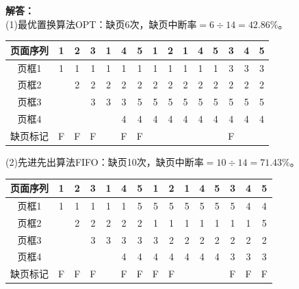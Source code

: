\documentclass[10pt,a4paper,UTF8]{ctexart}
\newenvironment{solution}{\noindent\textbf{解答：}\\ \indent}{\par}
\begin{document}
\begin{solution}
	(1)最优置换算法OPT：缺页6次，缺页中断率$=6\div 14=42.86\%$。
	\begin{table}[H]
		\vspace{-0.5em}
		\centering
		\begin{tabular}{|c|c|c|c|c|c|c|c|c|c|c|c|c|c|c|}
		\hline
		页面序列 & 1 & 2 & 3 & 1 & 4 & 5 & 1 & 2 & 1 & 4 & 5 & 3 & 4 & 5 \\ \hline
		页框1  & 1 & 1 & 1 & 1 & 1 & 1 & 1 & 1 & 1 & 1 & 1 & 3 & 3 & 3 \\ \hline
		页框2  &   & 2 & 2 & 2 & 2 & 2 & 2 & 2 & 2 & 2 & 2 & 2 & 2 & 2 \\ \hline
		页框3  &   &   & 3 & 3 & 3 & 5 & 5 & 5 & 5 & 5 & 5 & 5 & 5 & 5 \\ \hline
		页框4  &   &   &   &   & 4 & 4 & 4 & 4 & 4 & 4 & 4 & 4 & 4 & 4 \\ \hline
		缺页标记 & F & F & F &   & F & F &   &   &   &   &   & F &   &   \\ \hline
		\end{tabular}
		\vspace{-1em}
	\end{table}

	(2)先进先出算法FIFO：缺页10次，缺页中断率$=10\div 14=71.43\%$。
	\begin{table}[H]
		\vspace{-0.5em}
		\centering
		\begin{tabular}{|c|c|c|c|c|c|c|c|c|c|c|c|c|c|c|}
		\hline
		页面序列 & 1 & 2 & 3 & 1 & 4 & 5 & 1 & 2 & 1 & 4 & 5 & 3 & 4 & 5 \\ \hline
		页框1  & 1 & 1 & 1 & 1 & 1 & 5 & 5 & 5 & 5 & 5 & 5 & 5 & 4 & 4 \\ \hline
		页框2  &   & 2 & 2 & 2 & 2 & 2 & 1 & 1 & 1 & 1 & 1 & 1 & 1 & 5 \\ \hline
		页框3  &   &   & 3 & 3 & 3 & 3 & 3 & 2 & 2 & 2 & 2 & 2 & 2 & 2 \\ \hline
		页框4  &   &   &   &   & 4 & 4 & 4 & 4 & 4 & 4 & 4 & 3 & 3 & 3 \\ \hline
		缺页标记 & F & F & F &   & F & F & F & F &   &   &   & F & F & F \\ \hline
		\end{tabular}
		\vspace{-1em}
	\end{table}


\end{solution}
\end{document}
